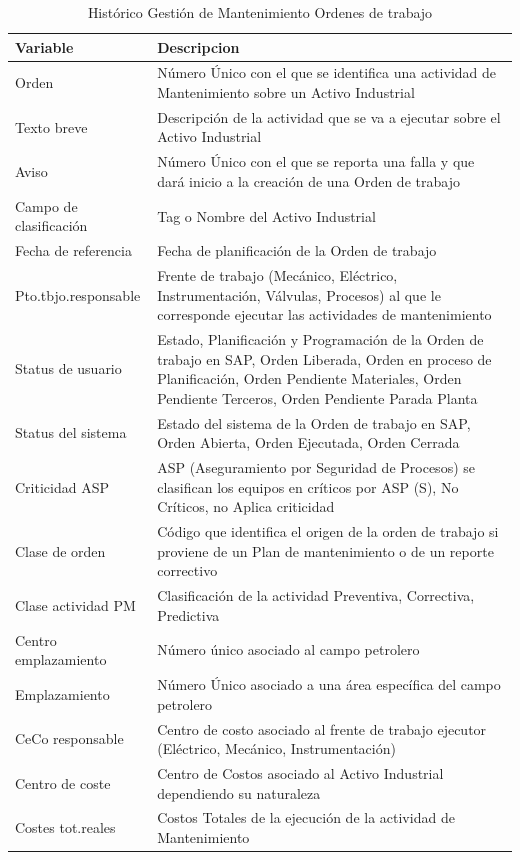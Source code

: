 \documentclass[
  11pt,
  bookmarksnumbered]{article}
\begin{document}
\begin{table}[H]

\caption{\label{tab:unnamed-chunk-6}Histórico Gestión de Mantenimiento Ordenes de trabajo}
\centering
\fontsize{9}{11}\selectfont
\begin{tabular}[t]{l|>{\raggedright\arraybackslash}p{35em}}
\hline
Variable & Descripcion\\
\hline
Orden & Número Único con el que se identifica una actividad de Mantenimiento sobre un Activo Industrial\\
\hline
Texto breve & Descripción de la actividad que se va a ejecutar sobre el Activo Industrial\\
\hline
Aviso & Número Único con el que se reporta una falla y que dará inicio a la creación de una Orden de trabajo\\
\hline
Campo de clasificación & Tag o Nombre del Activo Industrial\\
\hline
Fecha de referencia & Fecha de planificación de la Orden de trabajo\\
\hline
Pto.tbjo.responsable & Frente de trabajo (Mecánico, Eléctrico, Instrumentación, Válvulas, Procesos) al que le corresponde ejecutar las actividades de mantenimiento\\
\hline
Status de usuario & Estado, Planificación y Programación de la Orden de trabajo en SAP, Orden Liberada, Orden en proceso de Planificación, Orden Pendiente Materiales, Orden Pendiente Terceros, Orden Pendiente Parada Planta\\
\hline
Status del sistema & Estado del sistema de la Orden de trabajo en SAP, Orden Abierta, Orden Ejecutada, Orden Cerrada\\
\hline
Criticidad ASP & ASP (Aseguramiento por Seguridad de Procesos) se clasifican los equipos en críticos por ASP (S), No Críticos, no Aplica criticidad\\
\hline
Clase de orden & Código que identifica el origen de la orden de trabajo si proviene de un Plan de mantenimiento o de un reporte correctivo\\
\hline
Clase actividad PM & Clasificación de la actividad Preventiva, Correctiva, Predictiva\\
\hline
Centro emplazamiento & Número único asociado al campo petrolero\\
\hline
Emplazamiento & Número Único asociado a una área específica del campo petrolero\\
\hline
CeCo responsable & Centro de costo asociado al frente de trabajo ejecutor (Eléctrico, Mecánico, Instrumentación)\\
\hline
Centro de coste & Centro de Costos asociado al Activo Industrial dependiendo su naturaleza\\
\hline
Costes tot.reales & Costos Totales de la ejecución de la actividad de Mantenimiento\\
\hline
\end{tabular}
\end{table}
\end{document}
